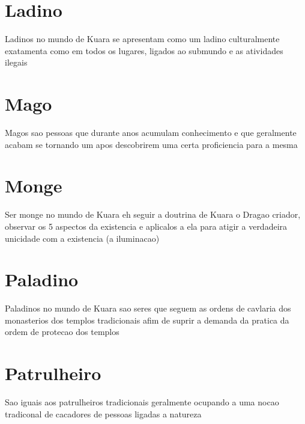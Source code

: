 \documentclass{book}
\begin{document}
\section{Ladino}
Ladinos no mundo de Kuara se apresentam como um ladino culturalmente exatamenta como em 
todos os lugares, ligados ao submundo e as atividades ilegais 
\section{Mago}
Magos sao pessoas que durante anos acumulam conhecimento e que geralmente acabam se tornando 
um apos descobrirem uma certa proficiencia para a mesma 
\section{Monge}
Ser monge no mundo de Kuara eh seguir a doutrina de Kuara o Dragao criador, observar os 5 
aspectos da existencia e aplicalos a ela para atigir a verdadeira unicidade com a existencia
(a iluminacao)
\section{Paladino}
Paladinos no mundo de Kuara sao seres que seguem as ordens de cavlaria dos monasterios dos 
templos tradicionais afim de suprir a demanda da pratica da ordem de protecao dos templos 
\section{Patrulheiro}
Sao iguais aos patrulheiros tradicionais geralmente ocupando a uma nocao tradiconal de 
cacadores de pessoas ligadas a natureza 
\end{document}
